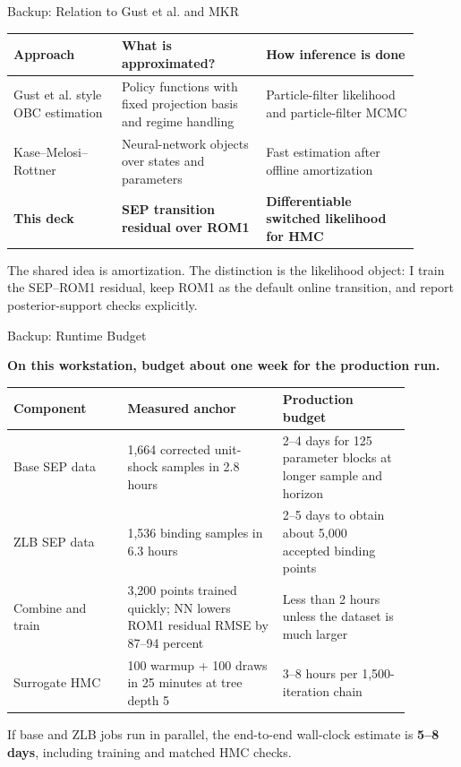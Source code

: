 \documentclass[aspectratio=169,10pt]{beamer}
\newcommand{\claim}[1]{%
  \begin{center}
  \parbox{0.94\linewidth}{\centering\large\bfseries #1}
  \end{center}
}
\begin{document}
\begin{frame}{Backup: Relation to Gust et al. and MKR}
\small
\begin{table}
\centering
\begin{tabular}{@{}>{\raggedright\arraybackslash}p{0.24\linewidth}>{\raggedright\arraybackslash}p{0.32\linewidth}>{\raggedright\arraybackslash}p{0.34\linewidth}@{}}
\toprule
Approach & What is approximated? & How inference is done \\
\midrule
Gust et al. style OBC estimation & Policy functions with fixed projection basis and regime handling & Particle-filter likelihood and particle-filter MCMC \\
Kase--Melosi--Rottner & Neural-network objects over states and parameters & Fast estimation after offline amortization \\
\textbf{This deck} & \textbf{SEP transition residual over ROM1} & \textbf{Differentiable switched likelihood for HMC} \\
\bottomrule
\end{tabular}
\end{table}

\vspace{0.45em}
\begin{center}
\small The shared idea is amortization. The distinction is the likelihood object: I train the SEP--ROM1 residual, keep ROM1 as the default online transition, and report posterior-support checks explicitly.
\end{center}
\end{frame}

\begin{frame}{Backup: Runtime Budget}
\claim{On this workstation, budget about one week for the production run.}

\vspace{0.2em}
\scriptsize
\begin{table}
\centering
\begin{tabular}{p{0.25\linewidth}p{0.34\linewidth}p{0.29\linewidth}}
\toprule
Component & Measured anchor & Production budget \\
\midrule
Base SEP data & 1,664 corrected unit-shock samples in 2.8 hours & 2--4 days for 125 parameter blocks at longer sample and horizon \\
ZLB SEP data & 1,536 binding samples in 6.3 hours & 2--5 days to obtain about 5,000 accepted binding points \\
Combine and train & 3,200 points trained quickly; NN lowers ROM1 residual RMSE by 87--94 percent & Less than 2 hours unless the dataset is much larger \\
Surrogate HMC & 100 warmup + 100 draws in 25 minutes at tree depth 5 & 3--8 hours per 1,500-iteration chain \\
\bottomrule
\end{tabular}
\end{table}

\vspace{0.25em}
\small If base and ZLB jobs run in parallel, the end-to-end wall-clock estimate is
\textbf{5--8 days}, including training and matched HMC checks.
\end{frame}
\end{document}
